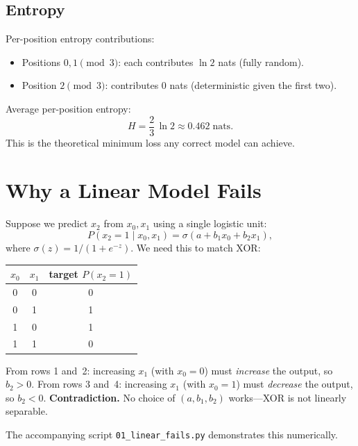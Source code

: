 \documentclass[11pt]{article}
\begin{document}
\subsection{Entropy}

Per-position entropy contributions:
\begin{itemize}
  \item Positions $0,1 \pmod{3}$: each contributes $\ln 2$ nats
        (fully random).
  \item Position $2 \pmod{3}$: contributes $0$ nats (deterministic
        given the first two).
\end{itemize}
Average per-position entropy:
\begin{equation}\label{eq:entropy}
  H = \frac{2}{3}\,\ln 2 \approx 0.462\;\text{nats}.
\end{equation}
This is the theoretical minimum loss any correct model can achieve.

\section{Why a Linear Model Fails}\label{sec:linear_fails}

Suppose we predict $x_2$ from $x_0, x_1$ using a single logistic unit:
\[
  P(x_2 = 1 \mid x_0, x_1) = \sigma(a + b_1 x_0 + b_2 x_1),
\]
where $\sigma(z) = 1/(1 + e^{-z})$.  We need this to match XOR:
\begin{center}
\begin{tabular}{cc|c}
\toprule
$x_0$ & $x_1$ & target $P(x_2=1)$ \\
\midrule
0 & 0 & 0 \\
0 & 1 & 1 \\
1 & 0 & 1 \\
1 & 1 & 0 \\
\bottomrule
\end{tabular}
\end{center}
From rows 1 and~2: increasing $x_1$ (with $x_0=0$) must
\emph{increase} the output, so $b_2 > 0$.  From rows 3 and~4:
increasing $x_1$ (with $x_0=1$) must \emph{decrease} the output, so
$b_2 < 0$.  \textbf{Contradiction.}  No choice of $(a, b_1, b_2)$
works---XOR is not linearly separable.

The accompanying script \texttt{01\_linear\_fails.py} demonstrates this
numerically.

\end{document}
